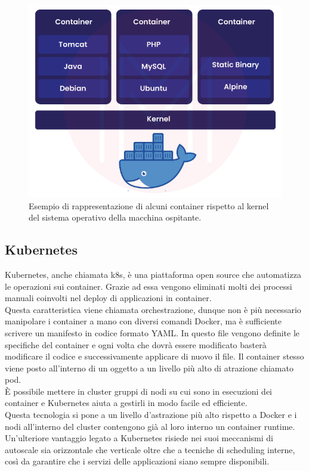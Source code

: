 \documentclass[a4paper,12pt]{report}
\begin{document}
\begin{figure}[h]
	\includegraphics[width=1.0\textwidth]{docker}
    \caption{Esempio di rappresentazione di alcuni container rispetto al kernel del sistema operativo della macchina ospitante. \cite{dockerimg}}
    \label{fig:docker}
\end{figure}


\subsection{Kubernetes}
Kubernetes, anche chiamata k8s, è una piattaforma open source che automatizza le operazioni sui container. Grazie ad essa vengono eliminati molti dei processi manuali coinvolti nel deploy di applicazioni in container. \\
Questa caratteristica viene chiamata orchestrazione, dunque non è più necessario manipolare i container a mano con diversi comandi Docker, ma è sufficiente scrivere un manifesto in codice formato YAML. In questo file vengono definite le specifiche del container e ogni volta che dovrà essere modificato basterà modificare il codice e successivamente applicare di nuovo il file. Il container stesso viene posto all'interno di un oggetto a un livello più alto di atrazione chiamato pod.\\
È possibile mettere in cluster gruppi di nodi su cui sono in esecuzioni dei container e Kubernetes aiuta a gestirli in modo facile ed efficiente.\\
Questa tecnologia si pone a un livello d'astrazione più alto rispetto a Docker e i nodi all'interno del cluster contengono già al loro interno un container runtime.\cite{kubernetes}\\ 
Un'ulteriore vantaggio legato a Kubernetes risiede nei suoi meccanismi di autoscale sia orizzontale che verticale oltre che a tecniche di scheduling interne, così da garantire che i servizi delle applicazioni siano sempre disponibili.
\end{document}
